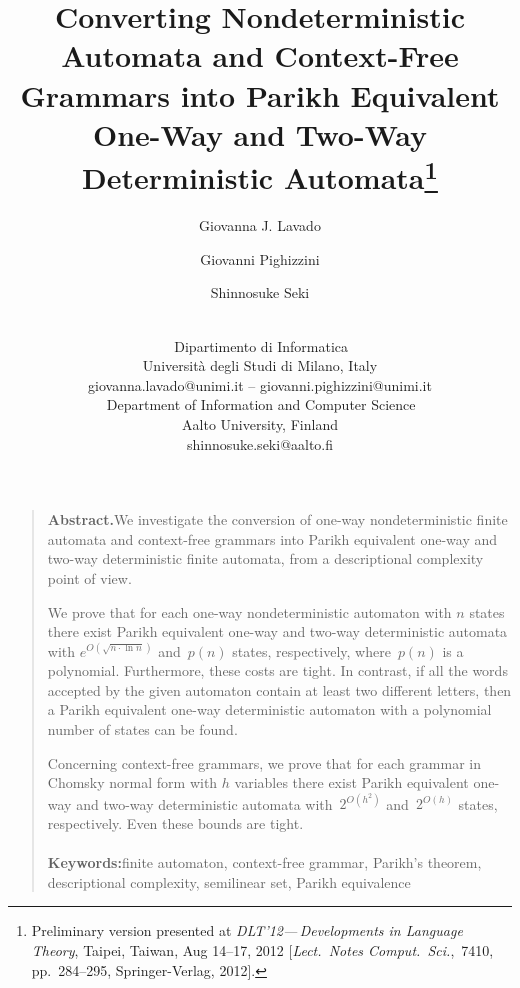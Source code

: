 \documentclass[11pt]{article}
\begin{document}
\title{Converting Nondeterministic Automata and Context-Free Grammars into Parikh Equivalent One-Way and
Two-Way Deterministic Automata\footnote{Preliminary version presented at
  \emph{DLT'12---\,Developments in Language Theory}, Taipei,
  Taiwan, Aug 14--17, 2012 [\emph{Lect.\ Notes Comput.\
  Sci.},\ 7410, pp.\ 284--295, Springer-Verlag, 2012]\@.}}\author{Giovanna J. Lavado\footnotemark[3]\and
Giovanni Pighizzini\footnotemark[3]\and
Shinnosuke Seki\footnotemark[4]\and
\mbox{}\\
{\normalsize \mbox{\footnotemark[3] }\,Dipartimento di Informatica}\\
{\normalsize  Universit\`{a} degli Studi di Milano, Italy}\\
{\small\sf giovanna.lavado@unimi.it} --
{\small\sf giovanni.pighizzini@unimi.it}\\[2ex]{\normalsize \mbox{\footnotemark[4] }\,Department of Information and Computer Science}\\
{\normalsize Aalto University, Finland}\\
{\small\sf shinnosuke.seki@aalto.fi}}
\date{}\maketitle\thispagestyle{empty}\maketitle\thispagestyle{empty}\begin{quotation}\small\noindent
  \textbf{Abstract.}\hspace{\labelsep}We investigate the conversion of one-way nondeterministic finite automata and context-free grammars into
Parikh equivalent one-way and two-way deterministic finite automata, {}from a descriptional complexity point of view.

We prove that for each one-way nondeterministic automaton with $n$ states there exist Parikh equivalent
one-way and two-way deterministic automata with $e^{O(\sqrt{n \cdot \ln n})}$ and~$p(n)$ states, respectively,
where~$p(n)$ is a polynomial. Furthermore, these costs are tight.
In contrast, if all the words accepted by the given automaton contain at least two different
letters, then a Parikh equivalent one-way deterministic automaton with a polynomial number of states can
be found.

Concerning context-free grammars, we prove that for each grammar in Chomsky normal form with $h$ 
variables there exist Parikh equivalent one-way and two-way deterministic automata with~$2^{O(h^2)}$ 
and~$2^{O(h)}$ states, respectively.
Even these bounds are tight.\\
\mbox{}\\
\textbf{Keywords:}\hspace{\labelsep}finite automaton,
	context-free grammar, 
	Parikh's theorem,
	descriptional complexity,
	semilinear set, 
	Parikh equivalence
\end{quotation}
\end{document}

